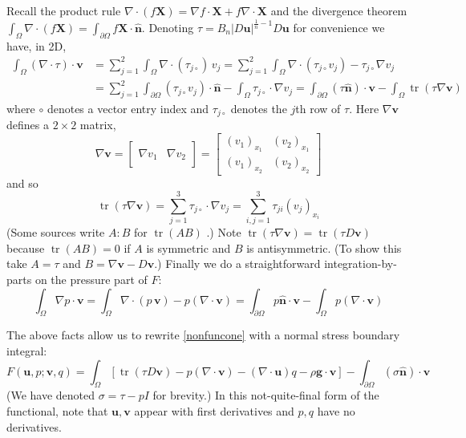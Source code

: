 \documentclass[letterpaper,final,12pt,reqno]{amsart}
\newcommand{\grad}{\nabla}
\newcommand{\trace}{\operatorname{tr}}
\newcommand{\hbn}{\hat{\mathbf{n}}}
\newcommand{\bu}{\mathbf{u}}
\newcommand{\bv}{\mathbf{v}}
\newcommand{\bX}{\mathbf{X}}
\begin{document}
Recall the product rule $\nabla \cdot(f\bX) = \grad f\cdot \bX + f \nabla \cdot \bX$ and the divergence theorem $\int_\Omega \nabla \cdot (f\bX) = \int_{\partial \Omega} f\bX \cdot \hbn$.  Denoting $\tau = B_n |D\bu|^{\frac{1}{n} - 1} D\bu$ for convenience we have, in 2D,
\begin{align*}
\int_\Omega \left(\nabla \cdot \tau\right)\cdot \bv &= \sum_{j=1}^2 \int_\Omega \nabla \cdot (\tau_{j\circ})\, v_j = \sum_{j=1}^2 \int_\Omega \nabla \cdot (\tau_{j\circ} v_j) - \tau_{j\circ} \nabla v_j \\
  &= \sum_{j=1}^2 \int_{\partial \Omega} (\tau_{j\circ} v_j) \cdot \hbn - \int_\Omega \tau_{j\circ} \cdot \nabla v_j = \int_{\partial \Omega} (\tau \hbn)\cdot \bv - \int_\Omega \trace(\tau \nabla \bv)
\end{align*}
where $\circ$ denotes a vector entry index and $\tau_{j\circ}$ denotes the $j$th row of $\tau$.  Here $\grad\bv$ defines a $2\times 2$ matrix,
\newcommand{\treftwo}[2]{\left[\begin{array}{c|c} & \\ #1 & #2 \\ & \end{array}\right]}
\newcommand{\trefthree}[3]{\left[\begin{array}{c|c|c} & & \\ #1 & #2 & #3 \\ & & \end{array}\right]}
    $$\grad \bv = \treftwo{\grad v_1}{\grad v_2} = \begin{bmatrix}
    (v_1)_{x_1} & (v_2)_{x_1} \\
    (v_1)_{x_2} & (v_2)_{x_2}
    \end{bmatrix}$$
and so
    $$\trace(\tau \grad \bv) = \sum_{j=1}^3 \tau_{j\circ} \cdot \grad v_j = \sum_{i,j=1}^3 \tau_{ji} (v_j)_{x_i}$$
(Some sources write $A:B$ for $\trace(AB)$ \cite{JouvetRappaz2011}.)  Note $\trace(\tau \grad \bv) = \trace(\tau D\bv)$ because $\trace(AB)=0$ if $A$ is symmetric and $B$ is antisymmetric.  (To show this take $A=\tau$ and $B=\grad\bv-D\bv$.)  Finally we do a straightforward integration-by-parts on the pressure part of $F$:
    $$\int_\Omega \nabla p \cdot \bv = \int_\Omega \nabla\cdot (p\,\bv) - p (\nabla \cdot \bv) = \int_{\partial \Omega} p\hbn \cdot \bv - \int_\Omega p (\nabla \cdot \bv)$$

The above facts allow us to rewrite \eqref{nonfuncone} with a normal stress boundary integral:
\begin{equation}
F(\bu,p;\bv,q) =  \int_\Omega \left[\trace(\tau D\bv) - p (\nabla \cdot \bv) - \left(\nabla \cdot \bu\right) q - \rho \mathbf{g} \cdot \bv\right] - \int_{\partial\Omega} (\sigma \hbn)\cdot \bv \label{nonfunctwo}
\end{equation}
(We have denoted $\sigma=\tau-pI$ for brevity.)  In this not-quite-final form of the functional, note that $\bu,\bv$ appear with first derivatives and $p,q$ have no derivatives.
\end{document}
